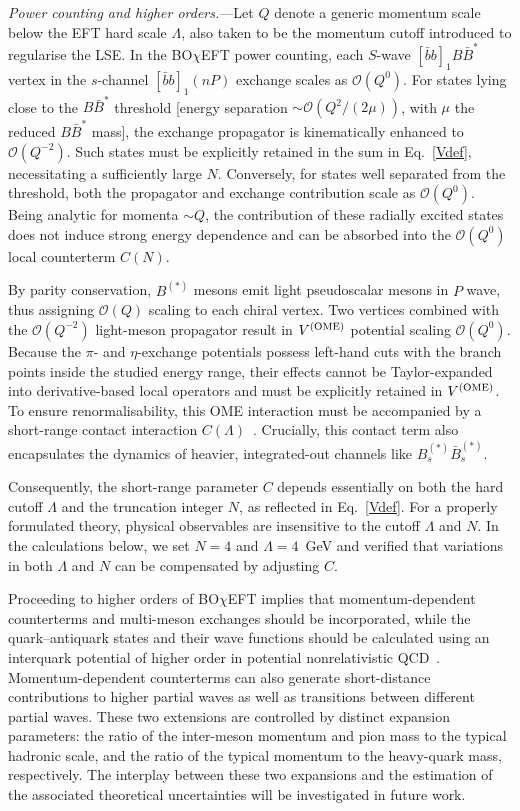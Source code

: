 \documentclass[aps,prl,showpacs,amsmath,twocolumn,superscriptaddress,floatfix,nofootinbib,notitlepage]{revtex4-2}
\newcommand{\bbnP}{[\bar{b}b]_1(nP)}
\newcommand{\BOchiEFT}{BO$\chi$EFT\xspace}
\newcommand{\VOME}{V^{\rm (OME)}}
\begin{document}
{\it Power counting and higher orders.}---Let $Q$ denote a generic momentum scale below the EFT hard scale $\Lambda$, also taken to be the momentum cutoff introduced to regularise the LSE.
In the \BOchiEFT power counting, each $S$-wave $[\bar{b}b]_1B\bar{B}^*$ vertex in the $s$-channel $\bbnP$ exchange scales as $\mathcal{O}(Q^0)$. For states lying close to the $B\bar{B}^*$ threshold [energy separation $\sim \mathcal{O}(Q^2/(2\mu))$, with $\mu$ the reduced $B\bar{B}^*$ mass], the exchange propagator is kinematically enhanced to $\mathcal{O}(Q^{-2})$. Such states must be explicitly retained in the sum in Eq.~\eqref{Vdef}, necessitating a sufficiently large $N$. Conversely, for states well separated from the threshold, both the propagator and exchange contribution scale as $\mathcal{O}(Q^0)$. Being analytic for momenta $\sim Q$, the contribution of these radially excited states does not induce strong energy dependence and can be absorbed into the $\mathcal{O}(Q^0)$ local counterterm $C(N)$.

By parity conservation, $B^{(*)}$ mesons emit light pseudoscalar mesons in $P$ wave, thus assigning $\mathcal{O}(Q)$ scaling to each chiral vertex. Two vertices combined with the $\mathcal{O}(Q^{-2})$ light-meson propagator result in $\VOME$ potential scaling $\mathcal{O}(Q^0)$. Because the $\pi$- and $\eta$-exchange potentials possess left-hand cuts with the branch points inside the studied energy range, their effects cannot be Taylor-expanded into derivative-based local operators and must be explicitly retained in $\VOME$. To ensure  renormalisability, this OME interaction must be accompanied by a short-range contact interaction $C(\Lambda)$~\cite{Baru:2015nea}. Crucially, this contact term also encapsulates the dynamics of heavier, integrated-out channels like $B_s^{(*)}\bar{B}^{(*)}_s$.

Consequently, the short-range parameter $C$ depends essentially on both the hard cutoff $\Lambda$ and the truncation integer $N$, as reflected in Eq.~\eqref{Vdef}. For a properly formulated theory, physical observables are insensitive to the cutoff $\Lambda$ and $N$. In the calculations below, we set $N=4$ and $\Lambda=4$~GeV and verified that variations in both $\Lambda$ and $N$ can be compensated by adjusting $C$.

Proceeding to higher orders of \BOchiEFT implies that momentum-dependent counterterms and multi-meson exchanges should be incorporated, while the quark--antiquark states and their wave functions should be calculated using an interquark potential of higher order in potential nonrelativistic QCD~\cite{Brambilla:1999xf,Brambilla:2000gk,Pineda:2000sz,Brambilla:2004jw}. Momentum-dependent counterterms can also generate short-distance contributions to higher partial waves as well as transitions between different partial waves. These two extensions are controlled by distinct expansion parameters: the ratio of the inter-meson momentum and pion mass to the typical hadronic scale, and the ratio of the typical momentum to the heavy-quark mass, respectively. The interplay between these two expansions and the estimation of the associated theoretical uncertainties will be investigated in future work.
\end{document}
